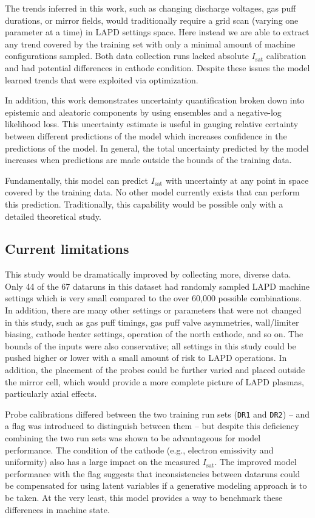 The trends inferred in this work, such as changing discharge voltages, gas puff durations, or mirror fields, would traditionally require a grid scan (varying one parameter at a time) in LAPD settings space. Here instead we are able to extract any trend covered by the training set with only a minimal amount of machine configurations sampled. Both data collection runs lacked absolute $I_\text{sat}$ calibration and had potential differences in cathode condition. Despite these issues the model learned trends that were exploited via optimization. 

In addition, this work demonstrates uncertainty quantification broken down into epistemic and aleatoric components by using ensembles and a negative-log likelihood loss. This uncertainty estimate is useful in gauging relative certainty between different predictions of the model which increases confidence in the predictions of the model. In general, the total uncertainty predicted by the model increases when predictions are made outside the bounds of the training data. 

Fundamentally, this model can predict $I_\text{sat}$ with uncertainty at any point in space covered by the training data. No other model currently exists that can perform this prediction. Traditionally, this capability would be possible only with a detailed theoretical study. 

\subsection{Current limitations}

This study would be dramatically improved by collecting more, diverse data. Only 44 of the 67 dataruns in this dataset had randomly sampled LAPD machine settings which is very small compared to the over 60,000 possible combinations. In addition, there are many other settings or parameters that were not changed in this study, such as gas puff timings, gas puff valve asymmetries, wall/limiter biasing, cathode heater settings, operation of the north cathode, and so on. The bounds of the inputs were also conservative; all settings in this study could be pushed higher or lower with a small amount of risk to LAPD operations. In addition, the placement of the probes could be further varied and placed outside the mirror cell, which would provide a more complete picture of LAPD plasmas, particularly axial effects.

Probe calibrations differed between the two training run sets (\texttt{DR1} and \texttt{DR2}) -- and a flag was introduced to distinguish between them -- but despite this deficiency combining the two run sets was shown to be advantageous for model performance. The condition of the cathode (e.g., electron emissivity and uniformity) also has a large impact on the measured $I_\text{sat}$. The improved model performance with the flag suggests that inconsistencies between dataruns could be compensated for using latent variables if a generative modeling approach is to be taken. At the very least, this model provides a way to benchmark these differences in machine state.

